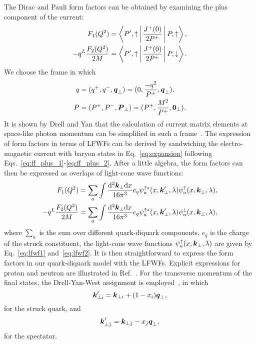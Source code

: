 \documentclass[aps,prc,preprint,groupedaddress,showpacs,superscriptaddress,floatfix]{revtex4-1}
\newcommand{\diff}{\ensuremath\mathrm{d}}
\renewcommand{\vec}[1]{\ensuremath\boldsymbol{#1}}
\begin{document}
The Dirac and Pauli form factors can be obtained by examining the plus component of the current:
%
\begin{align}
  F_1(Q^2) &= \Braket{P',\uparrow | \frac{J^+(0)}{2P^+} | P, \uparrow}, \label{eq:ff_plus_1}\\
  -q^L \frac{F_2(Q^2)}{2M} &= \Braket{P',\uparrow | \frac{J^+(0)}{2P^+} | P, \downarrow}. \label{eq:ff_plus_2}
\end{align}
%
We choose the frame in which
%
\begin{align}
  q &= (q^+, q^-, \vec{q}_\perp) = (0, \frac{-q^2}{P^+}, \vec{q}_\perp), \label{eq:dy_frame_1}\\
  P &= (P^+, P^-, \vec{P}_\perp) = (P^+, \frac{M^2}{P^+}, \vec{0}_\perp). \label{eq:dy_frame_2}
\end{align}
%
It is shown by Drell and Yan that the calculation of current matrix elements at space-like photon momentum can be simplified in such a frame~\cite{drell_connection_1970}. 
The expression of form factors in terms of LFWFs can be derived by sandwiching the electro-magnetic current with baryon states in Eq.~\eqref{eq:expansion} following Eqs.~\eqref{eq:ff_plus_1}-\eqref{eq:ff_plus_2}. After a little algebra, the form factors can then be expressed as overlaps of light-cone wave functions:
%
\begin{align}
  F_1(Q^2) &= \sum_a \int \frac{\diff^2 \vec{k}_\perp \diff x}{16\pi^3}
  e_q \psi_a^{\uparrow *}(x, \vec{k}'_{\perp}, \lambda)
  \psi_a^\uparrow (x, \vec{k}_{\perp}, \lambda), \label{eq:ffc_1}\\
  -q^L \frac{F_2(Q^2)}{2M} &= \sum_a \int \frac{\diff^2 \vec{k}_\perp \diff x}{16\pi^3}
  e_q \psi_a^{\uparrow *}(x, \vec{k}'_{\perp}, \lambda)
  \psi_a^\downarrow (x, \vec{k}_{\perp}, \lambda), \label{eq:ffc_2}
\end{align}
%
where $\sum_a$ is the sum over different quark-diquark components, $e_q$ is the charge of the struck constituent, the light-cone wave functions $\psi_a^{\uparrow}(x, \vec{k}_{\perp}, \lambda)$ are given by Eq.~\eqref{eq:lfwf1} and~\eqref{eq:lfwf2}.
It is then straightforward to express the form factors in our quark-diquark model with the LFWFs. Explicit expressions for proton and neutron are illustrated in Ref.~\cite{ma_flavor_2000}.
For the transverse momentum of the final states, the Drell-Yan-West assignment is employed~\cite{drell_connection_1970, west_phenomenological_1970}, in which
%
\begin{equation}
  \vec{k}'_{\perp i} = \vec{k}_{\perp i} + (1 - x_i) \vec{q}_\perp,
  \label{eq:dyw_quark}
\end{equation}
%
for the struck quark, and
%
\begin{equation}
  \vec{k}'_{\perp j} = \vec{k}_{\perp j} - x_j \vec{q}_\perp,
  \label{eq:dyw_spectator}
\end{equation}
%
for the spectator.
\end{document}
